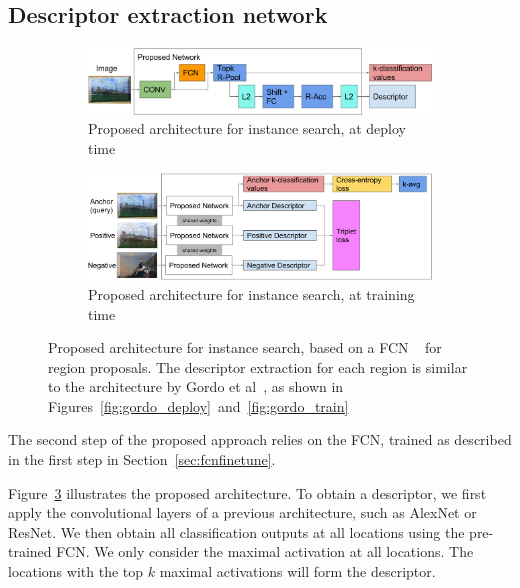 \subsection{Descriptor extraction network}
\begin{figure}
\begin{subfigure}{\textwidth}
\includegraphics[width=\textwidth]{img/contrib_deploy.png}
\caption{Proposed architecture for instance search, at deploy time
\label{fig:contribdeploy}}
\end{subfigure}

\begin{subfigure}{\textwidth}
\includegraphics[width=\textwidth]{img/contrib_train.png}
\caption{Proposed architecture for instance search, at training time
\label{fig:contribtrain}}
\end{subfigure}
\caption{Proposed architecture for instance search, based on a FCN
~\cite{long_fully_2015} for region proposals. The descriptor extraction
for each region is similar to the architecture by
Gordo et al~\cite{gordo_deep_2016}, as shown in
Figures~\ref{fig:gordo_deploy}~and~\ref{fig:gordo_train}
\label{fig:contrib}}
\end{figure}

The second step of the proposed approach relies on the FCN, trained
as described in the first step in Section~\ref{sec:fcnfinetune}.

Figure~\ref{fig:contrib} illustrates the proposed architecture.
To obtain a descriptor, we first apply the convolutional layers of
a previous architecture, such as AlexNet or ResNet. We then obtain all
classification outputs at all locations using the pre-trained FCN.
We only consider the maximal activation at all locations.
The locations with the top $k$ maximal activations will form the descriptor.

